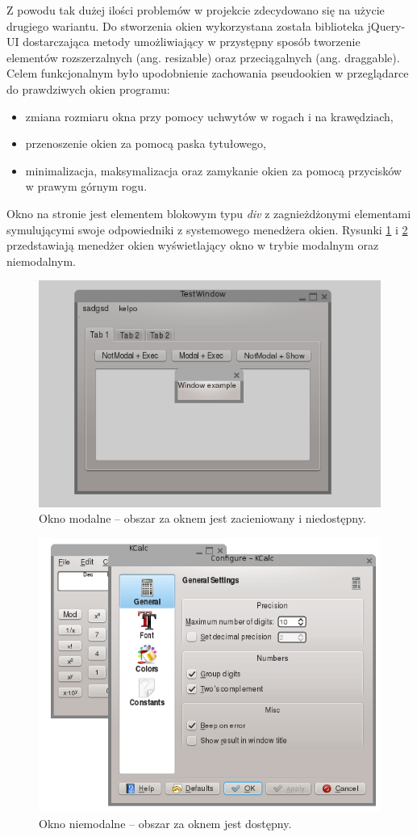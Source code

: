 Z powodu tak dużej ilości problemów w projekcie zdecydowano się na użycie drugiego wariantu. Do stworzenia okien wykorzystana została biblioteka jQuery-UI dostarczająca metody umożliwiający w przystępny sposób tworzenie elementów rozszerzalnych (ang. resizable) oraz przeciągalnych (ang. draggable). Celem funkcjonalnym było upodobnienie zachowania pseudookien w przeglądarce do prawdziwych okien programu:
\begin{itemize}
  \item zmiana rozmiaru okna przy pomocy uchwytów w rogach i na krawędziach,
  \item przenoszenie okien za pomocą paska tytułowego,
  \item minimalizacja, maksymalizacja oraz zamykanie okien za pomocą przycisków w prawym górnym rogu.
\end{itemize}

Okno na stronie jest elementem blokowym typu \emph{div} z zagnieżdżonymi elementami symulującymi swoje odpowiedniki z systemowego menedżera okien.
Rysunki \ref{fig:modal} i \ref{fig:non_modal} przedstawiają menedżer okien wyświetlający okno w trybie modalnym oraz niemodalnym.

\begin{figure}
\centering
\includegraphics[width=0.7\linewidth]{img/modal}
\caption{Okno modalne -- obszar za oknem jest zacieniowany i niedostępny.}
\label{fig:modal}
\end{figure}

\begin{figure}
\centering
\includegraphics[width=0.7\linewidth]{img/non_modal}
\caption{Okno niemodalne -- obszar za oknem jest dostępny.}
\label{fig:non_modal}
\end{figure}


